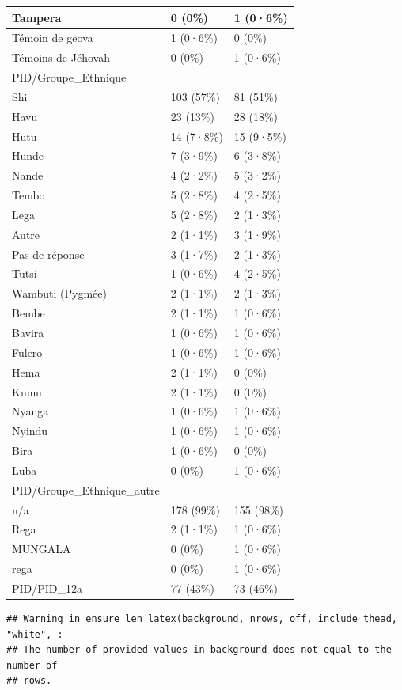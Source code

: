 \documentclass[
]{book}
\begin{document}
\begin{tabular}{l|l|l}
\hline
Tampera & 0 (0\%) & 1 (0·6\%)\\
\hline
Témoin de geova & 1 (0·6\%) & 0 (0\%)\\
\hline
Témoins de Jéhovah & 0 (0\%) & 1 (0·6\%)\\
\hline
PID/Groupe\_Ethnique &  & \\
\hline
Shi & 103 (57\%) & 81 (51\%)\\
\hline
Havu & 23 (13\%) & 28 (18\%)\\
\hline
Hutu & 14 (7·8\%) & 15 (9·5\%)\\
\hline
Hunde & 7 (3·9\%) & 6 (3·8\%)\\
\hline
Nande & 4 (2·2\%) & 5 (3·2\%)\\
\hline
Tembo & 5 (2·8\%) & 4 (2·5\%)\\
\hline
Lega & 5 (2·8\%) & 2 (1·3\%)\\
\hline
Autre & 2 (1·1\%) & 3 (1·9\%)\\
\hline
Pas de réponse & 3 (1·7\%) & 2 (1·3\%)\\
\hline
Tutsi & 1 (0·6\%) & 4 (2·5\%)\\
\hline
Wambuti (Pygmée) & 2 (1·1\%) & 2 (1·3\%)\\
\hline
Bembe & 2 (1·1\%) & 1 (0·6\%)\\
\hline
Bavira & 1 (0·6\%) & 1 (0·6\%)\\
\hline
Fulero & 1 (0·6\%) & 1 (0·6\%)\\
\hline
Hema & 2 (1·1\%) & 0 (0\%)\\
\hline
Kumu & 2 (1·1\%) & 0 (0\%)\\
\hline
Nyanga & 1 (0·6\%) & 1 (0·6\%)\\
\hline
Nyindu & 1 (0·6\%) & 1 (0·6\%)\\
\hline
Bira & 1 (0·6\%) & 0 (0\%)\\
\hline
Luba & 0 (0\%) & 1 (0·6\%)\\
\hline
PID/Groupe\_Ethnique\_autre &  & \\
\hline
n/a & 178 (99\%) & 155 (98\%)\\
\hline
Rega & 2 (1·1\%) & 1 (0·6\%)\\
\hline
MUNGALA & 0 (0\%) & 1 (0·6\%)\\
\hline
rega & 0 (0\%) & 1 (0·6\%)\\
\hline
PID/PID\_12a & 77 (43\%) & 73 (46\%)\\
\hline
\end{tabular}

\begin{verbatim}
## Warning in ensure_len_latex(background, nrows, off, include_thead, "white", :
## The number of provided values in background does not equal to the number of
## rows.
\end{verbatim}
\end{document}
